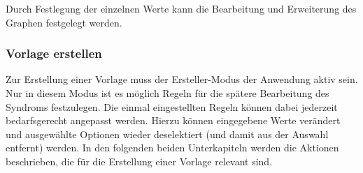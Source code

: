 \documentclass[enabledeprecatedfontcommands,fontsize=11pt,paper=a4,twoside]{scrartcl}
\newcounter{one}
\begin{document}
Durch Festlegung der einzelnen Werte kann die Bearbeitung und Erweiterung des Graphen festgelegt werden.

	\begin{figure}[ht!]
		\centering
		
	\end{figure}


\subsubsection{Vorlage erstellen}
Zur Erstellung einer Vorlage muss der Ersteller-Modus der Anwendung aktiv sein. Nur in diesem Modus ist es möglich Regeln für die spätere Bearbeitung des Syndroms festzulegen. Die einmal eingestellten Regeln können dabei jederzeit bedarfsgerecht angepasst werden. Hierzu können eingegebene Werte verändert und ausgewählte Optionen wieder deselektiert (und damit aus der Auswahl entfernt) werden. In den folgenden beiden Unterkapiteln werden die Aktionen beschrieben, die für die Erstellung einer Vorlage relevant sind. \\
\newpage
\end{document}
